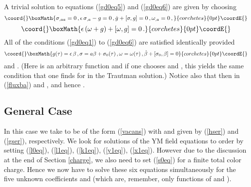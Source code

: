 \documentclass[a4paper,twocolumn,prd,showpacs,amsmath,amssymb]{revtex4}
\begin{document}
A trivial solution to equations (\ref{gd0eq5}) and (\ref{gd0eq6}) are given by choosing
\[\coord{}\boxMath{ \sigma_{,aa}=0 \, ,
\epsilon \, \sigma_{,a} - g =0 \, , \dot{g} + [\sigma,g] =0 \, , \omega_{,a} =0 \, , }{corchetes}{0pt}\coordE{}\]
\[\coord{}\boxMath{ \epsilon \, (\omega + g) + [\omega,g] =0 \, . }{corchetes}{0pt}\coordE{}\]
All of the conditions (\ref{gd0eq1}) to (\ref{gd0eq6}) are satisfied identically provided
\[\coord{}\boxMath{ g(\tau) = \epsilon \, \beta \, , \sigma = a \beta + \sigma_{0}(\tau) \, ,
\omega = \omega(\tau) \, , \dot{\beta} + [\sigma_{0},\beta] =0 }{corchetes}{0pt}\coordE{}\]
and \myHighlight{$[\beta,\omega]=\omega + \epsilon \, \beta$}\coordHE{}. (Here \coordHE{} is
an arbitrary function and if one chooses \coordHE{} and
\coordHE{}, this yields the same condition that one finds for \coordHE{} in the
Trautman solution.) Notice also that then \coordHE{} in \coordHE{}
(\ref{fluxba}) and \coordHE{}, and hence \coordHE{}.

\subsection{\label{gensol} General Case}

In this case we take \coordHE{} to be of the form (\ref{vacans}) with
\coordHE{} and \coordHE{} given by (\ref{hser}) and (\ref{gser}), respectively.
We look for solutions of the YM field equations to order \coordHE{} by
setting \coordHE{} (\ref{l0eq}), (\ref{l1eq}), (\ref{k1eq}),
(\ref{y1eq}), (\ref{x1eq}). However due to the discussion at the end of Section
\ref{charge}, we also need to set \coordHE{} (\ref{s0eq}) for a finite total
color charge. Hence we now have to solve these six equations simultaneously
for the five unknown coefficients \myHighlight{$\beta, \gamma, \sigma, \omega$}\coordHE{} and \myHighlight{$\delta$}\coordHE{}
(which are, remember, only functions of \myHighlight{$\tau$}\coordHE{} and \coordHE{}).
\end{document}
